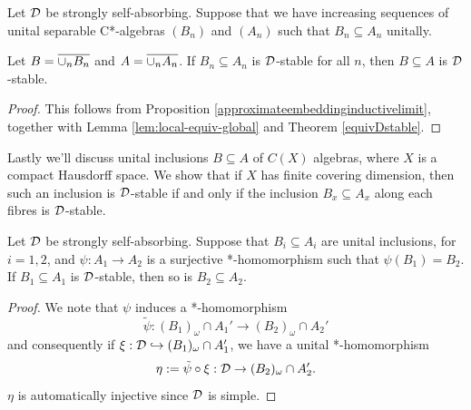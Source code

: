 \documentclass[12pt]{amsart}
\begin{document}
        \begin{prop}
          Let $\mathcal{D}$ be strongly self-absorbing.
Suppose that we have increasing sequences of unital separable C*-algebras $(B_n)$ and $(A_n)$ such that $B_n \subseteq A_n$ unitally.

Let $B = \overline{\cup_nB_n}$ and $A = \overline{\cup_n A_n}$. If $B_n \subseteq A_n$ is $\mathcal{D}$-stable for all $n$, then $B \subseteq A$ is $\mathcal{D}$-stable.
  \begin{proof}
    This follows from Proposition \ref{approximateembeddinginductivelimit}, together with Lemma \ref{lem:local-equiv-global} and Theorem \ref{equivDstable}.
  \end{proof}
        \end{prop}


        Lastly we'll discuss unital inclusions $B \subseteq A$ of $C(X)$ algebras, where $X$ is a compact Hausdorff space. We show that if $X$ has finite covering dimension, then such an inclusion is $\mathcal{D}$-stable if and only if the inclusion $B_x \subseteq A_x$ along each fibres is $\mathcal{D}$-stable. 

        \begin{lemma}\label{imageofinclusion}
            Let $\mathcal{D}$ be strongly self-absorbing.
Suppose that $B_i \subseteq A_i$ are unital inclusions, for $i=1,2$, and $\psi: A_1 \to A_2$ is a surjective *-homomorphism such that $\psi(B_1) = B_2$. If $B_1 \subseteq A_1$ is $\mathcal{D}$-stable, then so is $B_2 \subseteq A_2$.
              \begin{proof}
                We note that $\psi$ induces a *-homomorphism
\begin{equation}
                \tilde{\psi}: (B_1)_\omega \cap A_1' \to (B_2)_\omega \cap A_2'
\end{equation}
                and consequently if $\xi: \mathcal{D} \hookrightarrow (B_1)_\omega \cap A_1'$, we have a unital *-homomorphism
\begin{equation}
                \eta := \tilde{\psi} \circ \xi: \mathcal{D} \to (B_2)_\omega \cap A_2'.
\end{equation}
                $\eta$ is automatically injective since $\mathcal{D}$ is simple. 
              \end{proof}
          \end{lemma}
\end{document}
